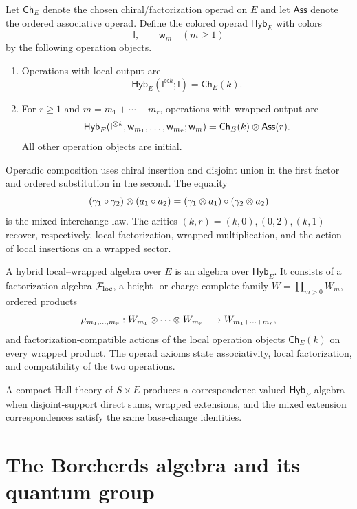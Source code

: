 \begin{definition}
Let $\mathsf{Ch}_E$ denote the chosen chiral/factorization operad on $E$ and let $\mathsf{Ass}$ denote the ordered associative operad. Define the colored operad $\mathsf{Hyb}_E$ with colors
\[
 \mathsf l,\qquad \mathsf w_m\quad(m\ge1)
\]
by the following operation objects.
\begin{enumerate}
\item Operations with local output are
\[
 \mathsf{Hyb}_E(\mathsf l^{\otimes k};\mathsf l)=\mathsf{Ch}_E(k).
\]
\item For $r\ge1$ and $m=m_1+\cdots+m_r$, operations with wrapped output are
\[
 \mathsf{Hyb}_E
 (\mathsf l^{\otimes k},\mathsf w_{m_1},\ldots,\mathsf w_{m_r};\mathsf w_m)
 =\mathsf{Ch}_E(k)\otimes\mathsf{Ass}(r).
\]
All other operation objects are initial.
\end{enumerate}
Operadic composition uses chiral insertion and disjoint union in the first factor and ordered substitution in the second. The equality
\[
 (\gamma_1\circ\gamma_2)\otimes(a_1\circ a_2)
 = (\gamma_1\otimes a_1)\circ(\gamma_2\otimes a_2)
\]
is the mixed interchange law. The arities $(k,r)=(k,0),(0,2),(k,1)$ recover, respectively, local factorization, wrapped multiplication, and the action of local insertions on a wrapped sector.
\end{definition}

\begin{definition}
A hybrid local--wrapped algebra over $E$ is an algebra over $\mathsf{Hyb}_E$. It consists of a factorization algebra $\mathcal F_{\mathrm{loc}}$, a height- or charge-complete family $W=\prod_{m>0}W_m$, ordered products
\[
 \mu_{m_1,\ldots,m_r}:W_{m_1}\otimes\cdots\otimes W_{m_r}
 \longrightarrow W_{m_1+\cdots+m_r},
\]
and factorization-compatible actions of the local operation objects $\mathsf{Ch}_E(k)$ on every wrapped product. The operad axioms state associativity, local factorization, and compatibility of the two operations.
\end{definition}

A compact Hall theory of $S\times E$ produces a correspondence-valued $\mathsf{Hyb}_E$-algebra when disjoint-support direct sums, wrapped extensions, and the mixed extension correspondences satisfy the same base-change identities.


\part{The Borcherds algebra and its quantum group}

